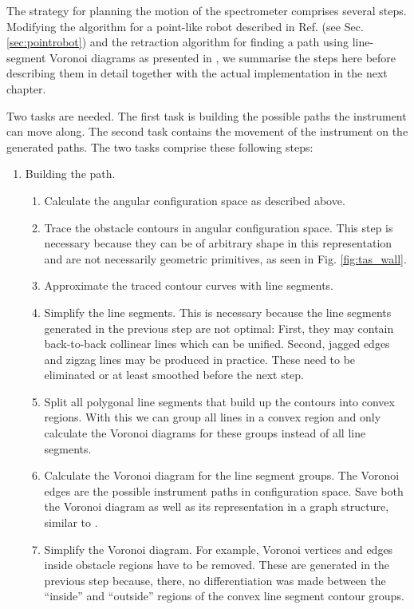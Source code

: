 The strategy for planning the motion of the spectrometer comprises several steps. Modifying the algorithm for
a point-like robot described in Ref. \cite[Ch. 13, pp. 283-306]{Berg2008} (see Sec. \ref{sec:pointrobot}) and the retraction algorithm
for finding a path using line-segment Voronoi diagrams as presented in \cite[p. 163]{Berg2008}, we summarise the
steps here before describing them in detail together with the actual implementation in the next chapter.

Two tasks are needed. The first task is building the possible paths the instrument can move along. The second task contains the movement of the instrument on the generated paths. The two tasks comprise these following steps:
\begin{enumerate}
	\item Building the path.
	\begin{enumerate}
		\item Calculate the angular configuration space as described above.
		\item Trace the obstacle contours in angular configuration space. This step is necessary because they can be of arbitrary
			shape in this representation and are not necessarily geometric primitives, as seen in Fig. \ref{fig:tas_wall}.
		\item Approximate the traced contour curves with line segments.
		\item Simplify the line segments. This is necessary because the line segments generated in the previous step are not optimal:
			First, they may contain back-to-back collinear lines which can be unified. Second, jagged edges and zigzag lines may be
			produced in practice. These need to be eliminated or at least smoothed before the next step.
		\item Split all polygonal line segments that build up the contours into convex regions. With this we can group all lines
			in a convex region and only calculate the Voronoi diagrams for these groups instead of all line segments.
		\item Calculate the Voronoi diagram for the line segment groups. The Voronoi edges are the
			possible instrument paths in configuration space. Save both the Voronoi diagram as well as its representation 
			in a graph structure, similar to \cite[p. 163]{Berg2008}.
		\item Simplify the Voronoi diagram. For example, Voronoi vertices and edges inside obstacle regions have to be removed.
			These are generated in the previous step because, there, no differentiation was made between the ``inside'' and
			``outside'' regions of the convex line segment contour groups.
	\end{enumerate}


\end{enumerate}
